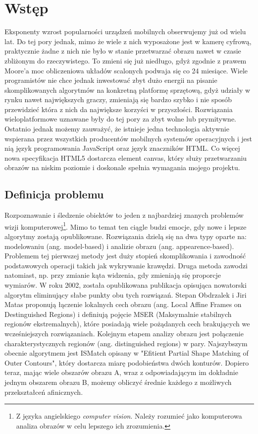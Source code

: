 \chapter{Wstęp}

Eksponenty wzrost popularności urządzeń mobilnych obserwujemy już od wielu lat.
Do tej pory jednak, mimo że wiele z nich wyposażone jest w kamerę cyfrową,
praktycznie żadne z nich nie było w stanie przetwarzać obrazu nawet w czasie
zbliżonym do rzeczywistego. To zmieni się już niedługo, gdyż zgodnie z prawem
Moore'a moc obliczeniowa układów scalonych podwaja się co 24 miesiące.  Wiele
programistów nie chce jednak inwestować zbyt dużo energii na pisanie
skomplikowanych algorytmów na konkretną platformę sprzętową, gdyż udziały w
rynku nawet największych graczy, zmieniają się bardzo szybko i nie sposób
przewidzieć która z nich da największe korzyści w przyszłości. Rozwiązania
wieloplatformowe uznawane były do tej pory za zbyt wolne lub prymitywne.
Ostatnio jednak możemy zauważyć, że istnieje jedna technologia aktywnie
wspierana przez wszystkich producentów mobilnych systemów operacyjnych i jest
nią język programowania JavaScript oraz język znaczników HTML. Co więcej nowa
specyfikacja HTML5 dostarcza element canvas, który służy przetwarzaniu obrazów
na niskim poziomie i doskonale spełnia wymagania mojego projektu.

\section{Definicja problemu}

Rozpoznawanie i śledzenie obiektów to jeden z najbardziej znanych problemów
wizji komputerowej\footnote{Z języka angielskiego \textit{computer vision}.
Należy rozumieć jako komputerowa analiza obrazów w celu lepszego ich
zrozumienia.}. Mimo to temat ten ciągle budzi emocje, gdy nowe i lepsze
algorytmy zostają opublikowane. Rozwiązania dzielą się na dwa typy oparte na:
modelowaniu (ang. model-based) i analizie obrazu (ang. appearence-based).
Problemem tej pierwszej metody jest duży stopień skomplikowania i zawodność
podstawowych operacji takich jak wykrywanie krawędzi. Druga metoda zawodzi
natomiast, np.  przy zmianie kąta widzenia, gdy zmieniają się proporcje
wymiarów.  W roku 2002, została opublikowana publikacja opisująca nowatorski
algorytm eliminujący słabe punkty obu tych rozwiązań. Stepan Obdrzalek i Jiri
Matas proponują łączenie lokalnych cech obrazu (ang. Local Affine Frames on
Destinguished Regions) i definiują pojęcie MSER (Maksymalnie stabilnych
regionów ekstremalnych), które posiadają wiele pożądanych cech brakujących we
wcześniejszych rozwiązaniach.  Kolejnym etapem analizy obrazu jest połączenie
charakterystycznych regionów (ang. distinguished regions) w pary. Najszybszym
obecnie algorytmem jest ISMatch opisany w "Efitient Partial Shape Matching of
Outer Contours", który dostarcza miarę podobieństwa dwóch konturów. Dopiero
teraz, mając wiele obszarów obrazu A, wraz z odpowiadającym im dokładnie jednym
obszarem obrazu B, możemy obliczyć średnie każdego z możliwych przekształceń
afinicznych.

